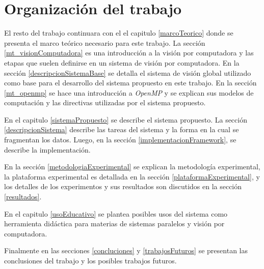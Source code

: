 
\section{Organización del trabajo}

El resto del trabajo continuara con el el capitulo \ref{marcoTeorico} donde se
presenta el marco teórico necesario para este trabajo. La sección
\ref{mt_visionComputadora} es una introducción a la visión por computadora y
las etapas que suelen definirse en un sistema de visión por computadora. En la
sección \ref{descripcionSistemaBase} se detalla el sistema de visión global
utilizado como base para el desarrollo del sistema propuesto en este trabajo.
En la sección \ref{mt_openmp} se hace una introducción a \emph{OpenMP} y se
explican sus modelos de computación y las directivas utilizadas por el sistema
propuesto.

En el capitulo \ref{sistemaPropuesto} se describe el sistema propuesto. La
sección \ref{descripcionSistema} describe las tareas del sistema y la forma en
la cual se fragmentan los datos. Luego, en la sección
\ref{implementacionFramework}, se describe la implementación.

En la sección \ref{metodologiaExperimental} se explican la metodología
experimental, la plataforma experimental es detallada en la sección
\ref{plataformaExperimental}, y los detalles de los experimentos y sus
resultados son discutidos en la sección \ref{resultados}.

En el capitulo \ref{usoEducativo} se plantea posibles usos del sistema como
herramienta didáctica para materias de sistemas paralelos y visión por
computadora.

Finalmente en las secciones \ref{concluciones} y \ref{trabajosFuturos} se
presentan las conclusiones del trabajo y los posibles trabajos futuros.
